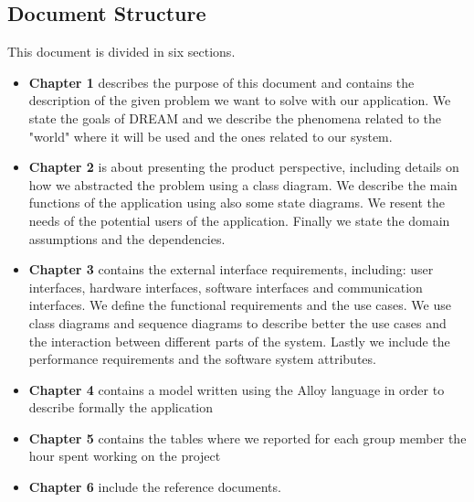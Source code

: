 \subsection{Document Structure}
This document is divided in six sections.
\begin{itemize}
    \item \textbf{Chapter 1} describes the purpose of this document and contains the description of the given problem we want to solve with our application. We state the goals of DREAM and we describe the phenomena related to the "world" where it will be used and the ones related to our system.
    
    \item \textbf{Chapter 2} is about presenting the product perspective, including details on how we abstracted the problem using a class diagram. We describe the main functions of the application using also some state diagrams. We resent the needs of the potential users of the application. Finally we state the domain assumptions and the dependencies.
    
    \item \textbf{Chapter 3} contains the external interface requirements, including: user interfaces, hardware interfaces, software interfaces and communication interfaces. We define the functional requirements and the use cases. We use class diagrams and sequence diagrams to describe better the use cases and the interaction between different parts of the system.  Lastly we include the performance requirements and the software system attributes.
    
    \item \textbf{Chapter 4} contains a model written using the Alloy language in order to describe formally the application
    
    \item \textbf{Chapter 5} contains the tables where we reported for each group member the hour spent working on the project
    
    \item \textbf{Chapter 6} include the reference documents.
 \end{itemize}

\vfill

